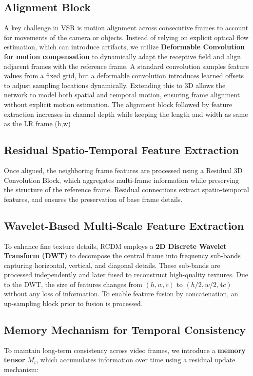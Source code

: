 \documentclass[11pt]{article}
\begin{document}
\subsection{Alignment Block}
A key challenge in VSR is motion alignment across consecutive frames to account for movements of the camera or objects. Instead of relying on explicit optical flow estimation, which can introduce artifacts, we utilize \textbf{Deformable Convolution for motion compensation} to dynamically adapt the receptive field and align adjacent frames with the reference frame. A standard convolution samples feature values from a fixed grid, but a deformable convolution introduces learned offsets to adjust sampling locations dynamically\cite{dai2017deformable}. Extending this to 3D allows the network to model both spatial and temporal motion, ensuring frame alignment without explicit motion estimation. The alignment block followed by feature extraction increases in channel depth while keeping the length and width as same as the LR frame (h,w)

\subsection{Residual Spatio-Temporal Feature Extraction}
Once aligned, the neighboring frame features are processed using a Residual 3D Convolution Block, which aggregates multi-frame information while preserving the structure of the reference frame. Residual connections extract spatio-temporal features, and ensures the preservation of base frame details.

\subsection{Wavelet-Based Multi-Scale Feature Extraction}
To enhance fine texture details, RCDM employs a \textbf{2D Discrete Wavelet Transform (DWT)} to decompose the central frame into frequency sub-bands capturing horizontal, vertical, and diagonal details. These sub-bands are processed independently and later fused to reconstruct high-quality textures. Due to the DWT, the size of features changes from $(h,w,c)$ to $(h/2,w/2,4c)$ without any loss of information. To enable feature fusion by concatenation, an up-sampling block prior to fusion is processed.

\subsection{Memory Mechanism for Temporal Consistency}
To maintain long-term consistency across video frames, we introduce a \textbf{memory tensor} $M_t$, which accumulates information over time using a residual update mechanism:
\end{document}
